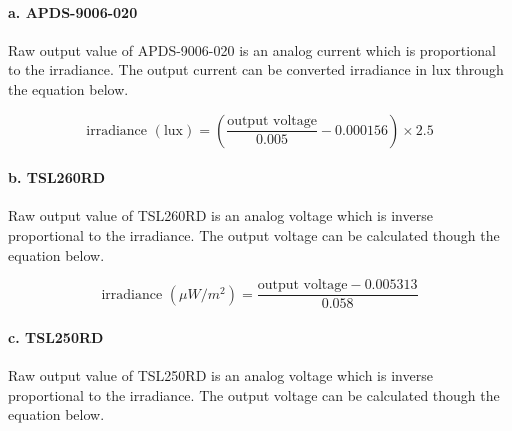 \paragraph{a. APDS-9006-020}

Raw output value of APDS-9006-020 is an analog current which is proportional to the irradiance. The output current can be converted irradiance in lux through the equation below.

\bigbreak

{\centering
 \[ \text{irradiance } (\text{lux}) = \left( \frac{\text{output voltage}}{0.005} - 0.000156 \right) \times 2.5 \]
 \par
 }

%  
 
\paragraph{b. TSL260RD}

Raw output value of TSL260RD is an analog voltage which is inverse proportional to the irradiance. The output voltage can be calculated though the equation below.

\bigbreak

{\centering
 \[ \text{irradiance } (\mu W/m^2) = \frac{\text{output voltage} - 0.005313}{0.058} \]
 \par
 }
 
%  

\paragraph{c. TSL250RD}

Raw output value of TSL250RD is an analog voltage which is inverse proportional to the irradiance. The output voltage can be calculated though the equation below.


